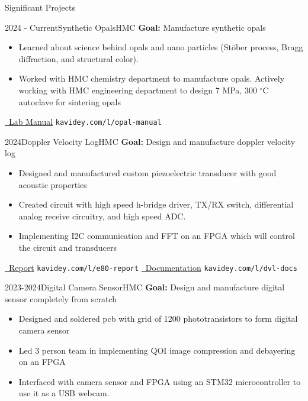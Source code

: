 \documentclass[]{mcdowellcv}
\begin{document}
\begin{cvsection}{Significant Projects}
	\begin{cvsubsection}{2024 - Current}{Synthetic Opals}{HMC}
		\textbf{Goal:} Manufacture synthetic opals
		\begin{itemize}
			\item Learned about science behind opals and nano particles (St\"ober process, Bragg diffraction, and structural color).
			\item Worked with HMC chemistry department to manufacture opals. Actively working with HMC engineering department to design 7 MPa, 300 $^\circ$C autoclave for sintering opals
		\end{itemize}
		\href{https://kavidey.notion.site/SNPs-Synthetic-Opals-Lab-Manual-648f35746e4c405987239699e7e6bfce?pvs=4/}{\faBook \ Lab Manual} \texttt{kavidey.com/l/opal-manual}
	\end{cvsubsection}
	\begin{cvsubsection}{2024}{\hypertarget{doppler_velocity_log}{Doppler Velocity Log}}{HMC}
		\textbf{Goal:} Design and manufacture doppler velocity log
		\begin{itemize}
			\item Designed and manufactured custom piezoelectric transducer with good acoustic properties
			\item Created circuit with high speed h-bridge driver, TX/RX switch, differential analog receive circuitry, and high speed ADC.
			\item Implementing I2C communication and FFT on an FPGA which will control the circuit and transducers
		\end{itemize}
		\href{https://kavidey.com/assets/projects/dvl/e80_report.pdf}{\faBook \ Report} \texttt{kavidey.com/l/e80-report}
		\href{https://docs.google.com/document/d/18yRygu0o4ie6aZtUGPSXawOBYlJCxya42LHkkw6iH5E/edit}{\faBook \ Documentation} \texttt{kavidey.com/l/dvl-docs}
	\end{cvsubsection}
	\begin{cvsubsection}{2023-2024}{Digital Camera Sensor}{HMC}
		\textbf{Goal:} Design and manufacture digital sensor completely from scratch
		\begin{itemize}
			\item Designed and soldered pcb with grid of 1200 phototransistors to form digital camera sensor
			\item Led 3 person team in implementing QOI image compression and debayering on an FPGA
			\item Interfaced with camera sensor and FPGA using an STM32 microcontroller to use it as a USB webcam.

\end{itemize}
\end{cvsubsection}
\end{cvsection}
\end{document}

